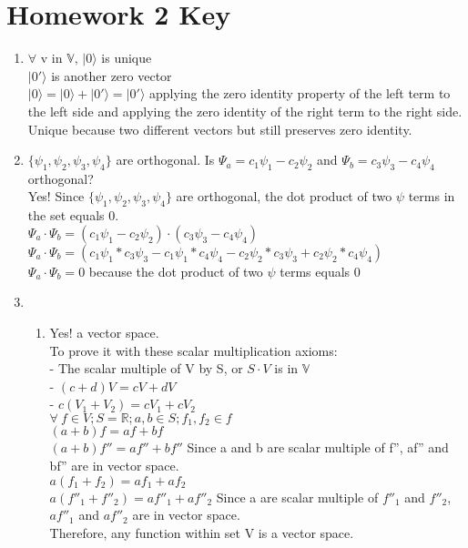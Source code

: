 \documentclass{article}
\begin{document}
\section*{Homework 2 Key}

\begin{enumerate}%

\item  
$\forall $ v in $ \mathbb{V}, \, |0\rangle$ is unique
\\ $|0'\rangle$ is another zero vector
\\ $|0\rangle = |0\rangle + |0'\rangle =|0'\rangle$ applying the zero identity property of the left term to the left side and applying the zero identity of the right term to the right side.
Unique because two different vectors but still preserves zero identity.
\item $\{\psi_1,\psi_2,\psi_3,\psi_4\}$ are orthogonal. Is $\Psi_a = c_1 \psi_1-c_2\psi_2$ and $\Psi_b=c_3\psi_3-c_4\psi_4$ orthogonal?
\\Yes! Since $\{\psi_1,\psi_2,\psi_3,\psi_4\}$ are orthogonal, the dot product of two $\psi$ terms in the set equals 0. 
\\ $\Psi_a\cdot\Psi_b=(c_1 \psi_1-c_2\psi_2) \cdot (c_3\psi_3-c_4\psi_4)$
\\ $\Psi_a\cdot\Psi_b=(c_1 \psi_1*c_3\psi_3 - c_1\psi_1*c_4\psi_4 - c_2\psi_2*c_3\psi_3+c_2\psi_2*c_4\psi_4)$
\\ $\Psi_a\cdot\Psi_b=0$ because the dot product of two $\psi$ terms equals 0
\item 
\begin{enumerate}
\item
Yes! a vector space. 
\\To prove it with these scalar multiplication axioms:
\\ - The scalar multiple of V by S, or $S\cdot V$ is in $\mathbb V$
\\ -  $(c+d)V=cV+dV$
\\ - $c(V_1+V_2)=cV_1+cV_2$
\\ $\forall~f \in V; S=\mathbb{R}; a,b \in S; f_1,f_2 \in f$
\\ $(a+b)f = af+bf$
\\ $(a+b)f''=af''+bf''$ Since a and b are scalar multiple of f'', af'' and bf'' are in vector space. 
\\ $a(f_1+f_2)=af_1+af_2$
\\ $a(f''_1+f''_2)=af''_1+af''_2$ Since a are scalar multiple of $f''_1$ and $f''_2$, $af''_1$ and $af''_2$ are in vector space.
\\ Therefore, any function within set V is a vector space.

\end{enumerate}
\end{enumerate}
\end{document}
